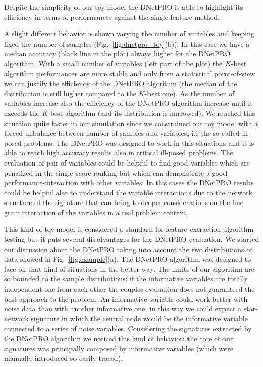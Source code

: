 \documentclass{standalone}
\begin{document}
Despite the simplicity of our toy model the DNetPRO is able to highlight its efficiency in terms of performances against the single-feature method.

A slight different behavior is shown varying the number of variables and keeping fixed the number of samples (Fig.~\ref{fig:dnetpro_toy}(b)).
In this case we have a median accuracy (black line in the plot) always higher for the DNetPRO algorithm.
With a small number of variables (left part of the plot) the $K$-best algorithm performances are more stable and only from a statistical point-of-view we can justify the efficiency of the DNetPRO algorithm (the median of the distribution is still higher compared to the $K$-best one).
As the number of variables increase also the efficiency of the DNetPRO algorithm increase until it exceeds the $K$-best algorithm (and its distribution is narrowed).
We reached this situation quite faster in our simulation since we constrained our toy model with a forced unbalance between number of samples and variables, i.e the so-called ill-posed problems.
The DNetPRO was designed to work in this situations and it is able to reach high accuracy results also in critical ill-posed problems.
The evaluation of pair of variables could be helpful to find good variables which are penalized in the single score ranking but which can demonstrate a good performance-interaction with other variables.
In this cases the DNetPRO results could be helpful also to understand the variable interactions due to the network structure of the signature that can bring to deeper considerations on the fine grain interaction of the variables in a real problem context.

This kind of toy model is considered a standard for feature extraction algorithm testing but it puts several disadvantages for the DNetPRO evaluation.
We started our discussion about the DNetPRO taking into account the two distributions of data showed in Fig.~\ref{fig:example}(a).
The DNetPRO algorithm was designed to face on that kind of situations in the better way.
The limits of our algorithm are so bounded to the sample distributions: if the informative variables are totally independent one from each other the couples evaluation does not guaranteed the best approach to the problem.
An informative variable could work better with noise data than with another informative one: in this way we could expect a star-network signature in which the central node would be the informative variable connected to a series of noise variables.
Considering the signatures extracted by the DNetPRO algorithm we noticed this kind of behavior: the core of our signatures was principally composed by informative variables (which were manually introduced so easily traced).
\end{document}
